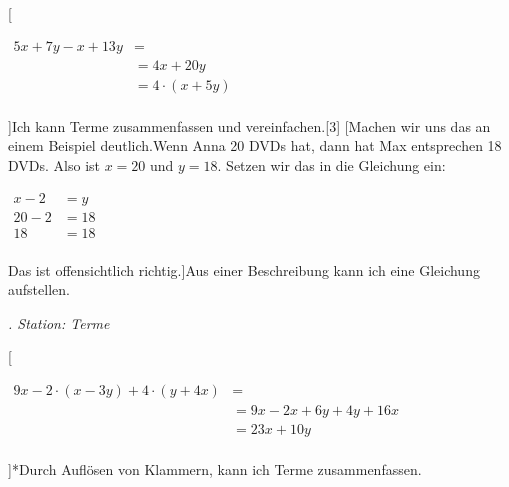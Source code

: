 \documentclass[
paper=a4,
fontsize=12pt,
headings=small,
parskip=half,
draft=false
]{scrartcl}
\newcounter{magicrownumbers}
\begin{document}
[\begin{minipage}{\tabucolX}
	\centering
	$\begin{aligned}
	5x+7y-x+13y &= \\
	&= 4x+20y \\
	&= 4\cdot\left(x+5y\right) \\
	\end{aligned}$
\end{minipage}]{Ich kann Terme zusammenfassen und vereinfachen.}{}[3]
[Machen wir uns das an einem Beispiel deutlich.\newline Wenn Anna 20 DVDs hat, dann hat Max entsprechen 18 DVDs. Also ist $ x = 20 $ und $ y = 18 $. Setzen wir das in die Gleichung ein:
\begin{minipage}{\tabucolX}
	\centering
	$\begin{aligned}
	x - 2 &= y \\
	20 - 2 &= 18 \\
	18 &= 18 \\
	\end{aligned}$
\end{minipage}
Das ist offensichtlich richtig.]{Aus einer Beschreibung kann ich eine Gleichung aufstellen.}{\item \textit{. Station: Terme}}

[\begin{minipage}{\tabucolX}
	\centering
	$\begin{aligned}
	9x-2\cdot\left(x-3y\right)+4\cdot\left(y+4x\right) &= \\
	 &= 9x-2x+6y+4y+16x \\
	 &= 23x+10y \\
	\end{aligned}$
\end{minipage}]*{Durch Auflösen von Klammern, kann ich Terme zusammenfassen.}{}
\end{document}
